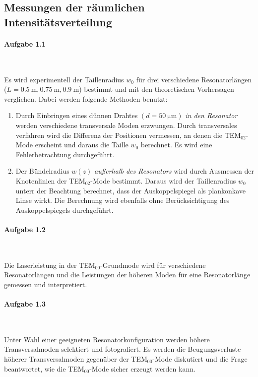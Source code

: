 \documentclass[a4paper,twoside,final]{article}
\begin{document}
\subsection{Messungen der räumlichen Intensitätsverteilung}

\paragraph{Aufgabe 1.1}$~$

Es wird experimentell der Taillenradius $w_0$ für drei verschiedene Resonatorlängen ($L= \SI{0.5}{\metre}, \SI{0.75}{\metre}, \SI{0.9}{\metre}$) bestimmt und mit den theoretischen Vorhersagen verglichen. Dabei werden folgende Methoden benutzt:
\begin{enumerate}
  \item Durch Einbringen eines dünnen Drahtes $(d =\SI{50}{\micro\metre})$ \emph{in den Resonator} werden verschiedene transversale Moden erzwungen. Durch transversales verfahren wird die Differenz der Positionen vermessen, an denen die TEM$_{02}$-Mode erscheint und daraus die Taille $w_0$ berechnet. Es wird eine Fehlerbetrachtung durchgeführt.
  \item Der Bündelradius $w(z)$ \emph{außerhalb des Resonators} wird durch Ausmessen der Knotenlinien der TEM$_{02}$-Mode bestimmt. Daraus wird der Taillenradius $w_0$ unterr der Beachtung berechnet, dass der Auskoppelspiegel als plankonkave Linse wirkt. Die Berechnung wird ebenfalls ohne Berücksichtigung des Auskoppelspiegels durchgeführt.
\end{enumerate}

\paragraph{Aufgabe 1.2}$~$

Die Laserleistung in der TEM$_{00}$-Grundmode wird für verschiedene Resonatorlängen und die Leistungen der höheren Moden für eine Resonatorlänge gemessen und interpretiert.

\paragraph{Aufgabe 1.3}$~$

Unter Wahl einer geeigneten Resonatorkonfiguration werden höhere Transversalmoden selektiert und fotografiert. Es werden die Beugungsverluste höherer Transversalmoden gegenüber der TEM$_{00}$-Mode diskutiert und die Frage beantwortet, wie die TEM$_{00}$-Mode sicher erzeugt werden kann.
\end{document}
